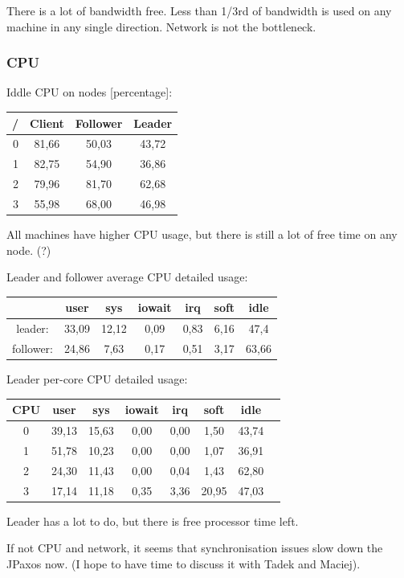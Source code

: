 There is a lot of bandwidth free. Less than 1/3rd of bandwidth is used on any machine in any single direction. Network is not the bottleneck.

\subsubsection{CPU}

Iddle CPU on nodes [percentage]:\\
{\ttfamily
\begin{tabular}{|r|c|c|c|}\hline
/ & Client & Follower & Leader \\ \hline
0 & 81,66  & 50,03    & 43,72  \\ \hline
1 & 82,75  & 54,90    & 36,86  \\ \hline
2 & 79,96  & 81,70    & 62,68  \\ \hline
3 & 55,98  & 68,00    & 46,98  \\ \hline
\end{tabular}         
}

All machines have higher CPU usage, but there is still a lot of free time on any node. (?)

\medskip

Leader and follower average CPU detailed usage:\\
{\ttfamily
\begin{tabular}{|c|c|c|c|c|c|c|}\hline
          &  user  &   sys  & iowait & irq   & soft  & idle  \\ \hline
leader:   & 33,09  & 12,12  & 0,09   & 0,83  & 6,16  & 47,4  \\ \hline
follower: & 24,86  &  7,63  & 0,17   & 0,51  & 3,17  & 63,66 \\ \hline            
\end{tabular}
}

\medskip

Leader per-core CPU detailed usage:\\
{\ttfamily
\begin{tabular}{|c|c|c|c|c|c|c|c|}\hline
CPU & user   & sys   & iowait& irq  &  soft  & idle  \\ \hline
0   & 39,13  & 15,63 & 0,00  & 0,00 &  1,50  & 43,74 \\ \hline
1   & 51,78  & 10,23 & 0,00  & 0,00 &  1,07  & 36,91 \\ \hline
2   & 24,30  & 11,43 & 0,00  & 0,04 &  1,43  & 62,80 \\ \hline
3   & 17,14  & 11,18 & 0,35  & 3,36 & 20,95  & 47,03 \\ \hline
\end{tabular}
}

Leader has a lot to do, but there is free processor time left.

If not CPU and network, it seems that synchronisation issues slow down the JPaxos now. (I hope to have time to discuss it with Tadek and Maciej).